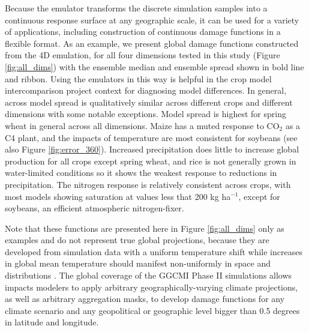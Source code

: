 \documentclass[gmd, manuscript]{copernicus} %
\begin{document}
Because the emulator transforms the discrete simulation samples into a continuous response surface at any geographic scale, it can be used for a variety of applications, including construction of continuous damage functions in a flexible format. 
As an example, we present global damage functions constructed from the 4D emulation, for all four dimensions tested in this study (Figure \ref{fig:all_dims}) with the ensemble median and ensemble spread shown in bold line and ribbon. 
Using the emulators in this way is helpful in the crop model intercomparison project context for diagnosing model differences. 
In general, across model spread is qualitatively similar across different crops and different dimensions with some notable exceptions. 
Model spread is highest for spring wheat in general across all dimensions.
Maize has a muted response to CO$_2$ as a C4 plant, and the impacts of temperature are most consistent for soybeans (see also Figure \ref{fig:error_360}).
Increased precipitation does little to increase global production for all crops except spring wheat, and rice is not generally grown in water-limited conditions so it shows the weakest response to reductions in precipitation.
The nitrogen response is relatively consistent across crops, with most models showing saturation at values less that 200 kg ha$^{-1}$, except for soybeans, an efficient atmospheric nitrogen-fixer.

Note that these functions are presented here in Figure \ref{fig:all_dims} only as examples and do not represent true global projections, because they are developed from simulation data with a uniform temperature shift while increases in global mean temperature should manifest non-uniformly in space and distributions \citep[e.g][]{Sippel2015}. 
The global coverage of the GGCMI Phase II simulations allows impacts modelers to apply arbitrary geographically-varying climate projections, as well as arbitrary aggregation masks, to develop damage functions for any climate scenario and any geopolitical or geographic level bigger than 0.5 degrees in latitude and longitude. 
\end{document}
